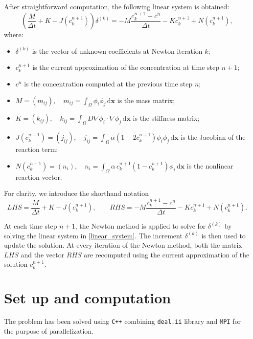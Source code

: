 \documentclass[12pt, a4paper, twoside, openright]{report}
\begin{document}
After straightforward computation, the following linear system is obtained:
\begin{equation}
  \label{linear_system}
  \left( \frac{M}{\Delta t} + K - J(c_k^{n+1}) \right)\delta^{(k)}
  = -M \frac{c_k^{n+1} - c^{n}}{\Delta t} - K c_k^{n+1} + N(c_k^{n+1}),
\end{equation}
where:
\begin{itemize}
  \item \(\delta^{(k)}\) is the vector of unknown coefficients at Newton iteration \(k\);
  \item \(c_k^{n+1}\) is the current approximation of the concentration at time step \(n+1\);
  \item \(c^{n}\) is the concentration computed at the previous time step \(n\);
  \item \(M = (m_{ij}), \quad m_{ij} = \int_{\Omega} \phi_i \phi_j \, \mathrm{d}\mathbf{x}\) is the mass matrix;
  \item \(K = (k_{ij}), \quad k_{ij} = \int_{\Omega} D \nabla \phi_i \cdot \nabla \phi_j \, \mathrm{d}\mathbf{x}\) is the stiffness matrix;
  \item \(J(c_k^{n+1}) = (j_{ij}), \quad j_{ij} = \int_{\Omega} \alpha (1 - 2c_k^{n+1}) \phi_i \phi_j \, \mathrm{d}\mathbf{x}\) is the Jacobian of the reaction term;
  \item \(N(c_k^{n+1}) = (n_i), \quad n_i = \int_{\Omega} \alpha \, c_k^{n+1}(1 - c_k^{n+1}) \phi_i \, \mathrm{d}\mathbf{x}\) is the nonlinear reaction vector.
\end{itemize}

For clarity, we introduce the shorthand notation
\[
  LHS = \frac{M}{\Delta t} + K - J(c_k^{n+1}),
  \qquad
  RHS = -M \frac{c_k^{n+1} - c^{n}}{\Delta t} - K c_k^{n+1} + N(c_k^{n+1}).
\]

At each time step \(n+1\), the Newton method is applied to solve for \(\delta^{(k)}\) by solving the linear system in \autoref{linear_system}.
The increment \(\delta^{(k)}\) is then used to update the solution.
At every iteration of the Newton method, both the matrix \(LHS\) and the vector \(RHS\) are recomputed using the current approximation of the solution \(c_k^{n+1}\).



\chapter{Set up and computation}
The problem has been solved using \verb|C++| combining \verb|deal.ii| library and \verb|MPI| for the purpose of parallelization.
\end{document}
